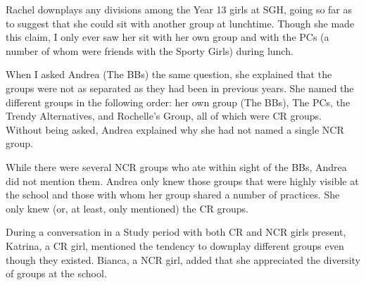 \noindent Rachel downplays any divisions among the Year 13 girls at SGH, going so far as to suggest that she could sit with another group at lunchtime.  Though she made this claim, I only ever saw her sit with her own group and with the PCs (a number of whom were friends with the Sporty Girls) during lunch.  


When I asked Andrea (The BBs) the same question, she explained that the groups were not as separated as they had been in previous years.  She named the different groups in the following order: her own group (The BBs), The PCs, the Trendy Alternatives, and Rochelle's Group, all of which were CR groups.  Without being asked, Andrea explained why she had not named a single NCR group.

\label{ex:thispartoflawn}

\vspace{5 mm}

\noindent While there were several NCR groups who ate within sight of the BBs, Andrea did not mention them.  Andrea only knew those groups that were highly visible at the school and those with whom her group shared a number of practices.  She only knew (or, at least, only mentioned) the CR groups.

During a conversation in a Study period with both CR and NCR girls present, Katrina, a CR girl, mentioned the tendency to downplay different groups even though they existed.  Bianca, a NCR girl, added that she appreciated the diversity of groups at the school.

